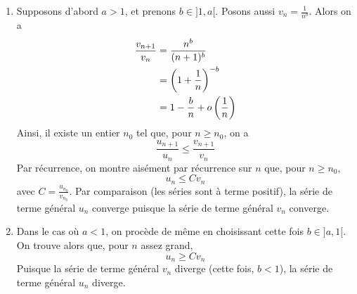 \begin{enumerate}
    \item Supposons d'abord $a>1$, et prenons $b\in ]1,a[$. Posons aussi $v_n=\frac{1}{n^b}$. Alors on a 
        \[
            \begin{aligned}
                \frac{v_{n+1}}{v_n}&=\frac {n^b}{(n+1)^b}\\
                &=\left(1+\frac{1}{n}\right)^{-b}\\
                &=1-\frac{b}{n}+o\left(\frac{1}{n}\right)
            \end{aligned}
        \]
        Ainsi, il existe un entier $n_0$ tel que, pour $n\geqslant n_0$, on a
        \[
            \frac{u_{n+1}}{u_n}\leqslant \frac{v_{n+1}}{v_n}
        \]
        Par récurrence, on montre aisément par récurrence sur $n$ que, pour $n\geqslant n_0$,
        \[
            u_n\leqslant C v_n
        \]
        avec $C=\frac{u_{n_0}}{v_{n_0}}$. Par comparaison (les séries sont à terme positif), la série de terme général
$u_n$ converge puisque la série de terme général $v_n$ converge.

    \item Dans le cas où $a<1$, on procède de même en choisissant cette fois $b\in]a,1[$. On trouve alors que, pour $n$
assez grand,
        \[
            u_n\geqslant C v_n
        \]
        Puisque la série de terme général $v_n$ diverge (cette fois, $b<1$), la série de terme général $u_n$ diverge.
    

\end{enumerate}
